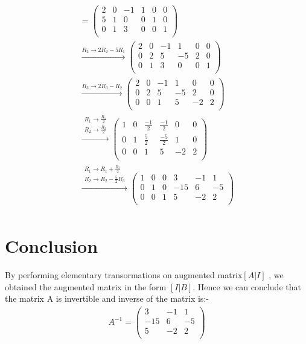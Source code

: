 \documentclass[journal,12pt,twocolumn]{IEEEtran}
\newcommand{\myvec}[1]{\ensuremath{\begin{pmatrix}#1\end{pmatrix}}}
\begin{document}
\begin{align}
 [A | I] = \myvec{
		 2 &0 &-1&  1 & 0 &  0 \\
		   5 &1 &0&  0 &  1 &  0 \\
		 0 &1 &3 &  0 &  0 &  1 \\
		 } \\
\xrightarrow{R_2\rightarrow 2R_2 - 5R_1} \myvec{
		 2 &0 &-1&  1 & 0 &  0 \\
		  0 &2 &5&  -5 &  2 &  0 \\
		 0 &1 &3 &  0 &  0 &  1 \\
		 } 
		 \\
 \xrightarrow{R_3\rightarrow 2R_3 - R_2} \myvec{
		 2 &0 &-1&  1 & 0 &  0 \\
		  0 &2 &5&  -5 &  2 &  0 \\
		 0 &0 &1 &  5 &  -2 &  2 \\
		 } \\
 \xrightarrow{\substack{R_1\rightarrow \frac{R_1}{2}\\R_2\rightarrow \frac{R_2}{2}}} \myvec{
		 1 & 0 & \frac{-1}{2} & \frac{-1}{2} & 0 &  0 \\
		  0 & 1 & \frac{5}{2} & \frac{-5}{2} &  1 &  0 \\
		 0 & 0 &1 &  5 &  -2 &  2 \\
		 } 	\\	 
\xrightarrow{\substack{R_1\rightarrow R_1  + \frac{R_3}{2}\\R_2\rightarrow R_2 - \frac{5}{2}R_3}} \myvec{
		 1 & 0 & 0 & 3 & -1 &  1 \\
		  0 & 1 & 0 & -15 &  6 &  -5 \\
		 0 & 0 &1 &  5 &  -2 &  2 \\
		 } 	\\	
\end{align}
\section{Conclusion}
By performing elementary transormations on augmented matrix$ [A | I]$ , we obtained the augmented matrix in the form $ [I|B]$. 
Hence we can conclude that the matrix A is invertible and inverse of the matrix is:-
\begin{align}
A^{-1} = \myvec{
		  3 & -1 &  1 \\
		 -15 &  6 & -5 \\
		  5 &  -2 &  2 \\
		 }
\end{align}
\end{document}
